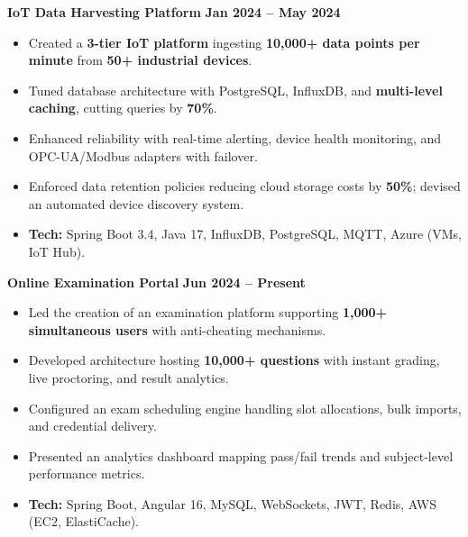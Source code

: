 \documentclass[8pt,a4paper,withhyper]{altacv}
\renewcommand{\cvevent}[4]{%
  {\large\color{emphasis}\textbf{#1}} \ifstrequal{#3}{}{}{\hfill {\normalsize\textbf{\color{accent}#3}}} \par
  \vspace{2pt}
  \ifstrequal{#2}{}{}{%
    {\normalsize\textbf{\color{body}#2}} \ifstrequal{#4}{}{}{\hfill {\normalsize\color{body}#4}} \par
  }%
  \vspace{4pt}\normalsize
}
\begin{document}
\cvevent{IoT Data Harvesting Platform}{}{Jan 2024 -- May 2024}{}
\begin{itemize}
\item Created a \textbf{3-tier IoT platform} ingesting \textbf{10,000+ data points per minute} from \textbf{50+ industrial devices}.
\item Tuned database architecture with PostgreSQL, InfluxDB, and \textbf{multi-level caching}, cutting queries by \textbf{70\%}.
\item Enhanced reliability with real-time alerting, device health monitoring, and OPC-UA/Modbus adapters with failover.
\item Enforced data retention policies reducing cloud storage costs by \textbf{50\%}; devised an automated device discovery system.
\item \textbf{Tech:} Spring Boot 3.4, Java 17, InfluxDB, PostgreSQL, MQTT, Azure (VMs, IoT Hub).
\end{itemize}

\vspace{4pt}{\color{body!30}\hrule}\vspace{4pt}

\cvevent{Online Examination Portal}{}{Jun 2024 -- Present}{}
\begin{itemize}
\item Led the creation of an examination platform supporting \textbf{1,000+ simultaneous users} with anti-cheating mechanisms.
\item Developed architecture hosting \textbf{10,000+ questions} with instant grading, live proctoring, and result analytics.
\item Configured an exam scheduling engine handling slot allocations, bulk imports, and credential delivery.
\item Presented an analytics dashboard mapping pass/fail trends and subject-level performance metrics.
\item \textbf{Tech:} Spring Boot, Angular 16, MySQL, WebSockets, JWT, Redis, AWS (EC2, ElastiCache).
\end{itemize}

\vspace{4pt}{\color{body!30}\hrule}\vspace{4pt}
\end{document}
